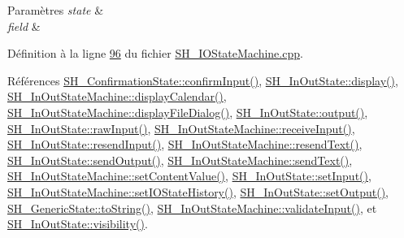 \begin{DoxyParams}{Paramètres}
{\em state} & \\
\hline
{\em field} & \\
\hline
\end{DoxyParams}


Définition à la ligne \hyperlink{SH__IOStateMachine_8cpp_source_l00096}{96} du fichier \hyperlink{SH__IOStateMachine_8cpp_source}{S\-H\-\_\-\-I\-O\-State\-Machine.\-cpp}.



Références \hyperlink{classSH__ConfirmationState_a039267260de5d102ac7511e6a5fae87f}{S\-H\-\_\-\-Confirmation\-State\-::confirm\-Input()}, \hyperlink{classSH__InOutState_a616f88b20478b81b2927a9ddc2b4f521}{S\-H\-\_\-\-In\-Out\-State\-::display()}, \hyperlink{classSH__InOutStateMachine_ab3a12d1f9b658d8ffdc17669a6c065f2}{S\-H\-\_\-\-In\-Out\-State\-Machine\-::display\-Calendar()}, \hyperlink{classSH__InOutStateMachine_abd206c3bc32bb7690df9c3e1cd546ebc}{S\-H\-\_\-\-In\-Out\-State\-Machine\-::display\-File\-Dialog()}, \hyperlink{classSH__InOutState_a17ed7eaf5e3ed5af80a4f9fe65d5bfd9}{S\-H\-\_\-\-In\-Out\-State\-::output()}, \hyperlink{classSH__InOutState_a4c674a54f41d2e6ef951b22393dcd89f}{S\-H\-\_\-\-In\-Out\-State\-::raw\-Input()}, \hyperlink{classSH__InOutStateMachine_a037ed5e13ecfae2123a8d4940292e410}{S\-H\-\_\-\-In\-Out\-State\-Machine\-::receive\-Input()}, \hyperlink{classSH__InOutState_a1f00480afefd173002cf56d4c4128048}{S\-H\-\_\-\-In\-Out\-State\-::resend\-Input()}, \hyperlink{classSH__InOutStateMachine_a526822c66b46aa0cd81ba4473fa5573f}{S\-H\-\_\-\-In\-Out\-State\-Machine\-::resend\-Text()}, \hyperlink{classSH__InOutState_a77921c5f42059bc97361f4ff7827da12}{S\-H\-\_\-\-In\-Out\-State\-::send\-Output()}, \hyperlink{classSH__InOutStateMachine_a5e7f5958bae31696b6a8deab94ad2b4f}{S\-H\-\_\-\-In\-Out\-State\-Machine\-::send\-Text()}, \hyperlink{classSH__InOutStateMachine_a9ab1534306b2bdb62743d4bcefe40c17}{S\-H\-\_\-\-In\-Out\-State\-Machine\-::set\-Content\-Value()}, \hyperlink{classSH__InOutState_aaec9c2b5ef7c406bff7469461352d47c}{S\-H\-\_\-\-In\-Out\-State\-::set\-Input()}, \hyperlink{classSH__InOutStateMachine_acbcce2c4300af1634d928b30e5e9be1c}{S\-H\-\_\-\-In\-Out\-State\-Machine\-::set\-I\-O\-State\-History()}, \hyperlink{classSH__InOutState_af611c84134e262739cd834797b315c80}{S\-H\-\_\-\-In\-Out\-State\-::set\-Output()}, \hyperlink{classSH__GenericState_a7779babbb40f3f8faa71112204d9804f}{S\-H\-\_\-\-Generic\-State\-::to\-String()}, \hyperlink{classSH__InOutStateMachine_aec1b3fef3c1f82499aa1f73beaecd08a}{S\-H\-\_\-\-In\-Out\-State\-Machine\-::validate\-Input()}, et \hyperlink{classSH__InOutState_a3a18752c4122c26a2ebf38310c9c1b75}{S\-H\-\_\-\-In\-Out\-State\-::visibility()}.




